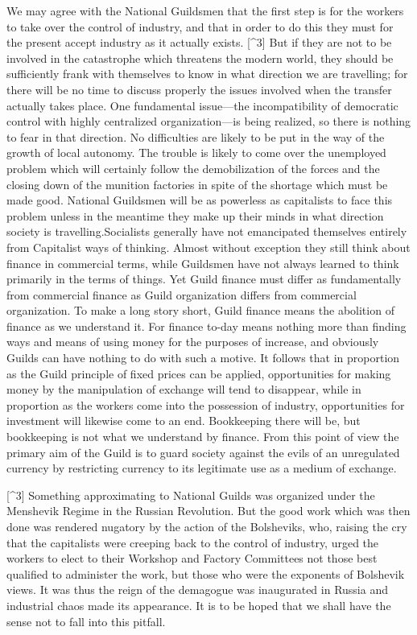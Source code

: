 \documentclass{book}
\begin{document}
We may agree with the National Guildsmen that the first step is for the workers to take over the control of industry, and that in order to do this they must for the present accept industry as it actually exists. {[}\textasciicircum{}3{]} But if they are not to be involved in the catastrophe which threatens the modern world, they should be sufficiently frank with themselves to know in what direction we are travelling; for there will be no time to discuss properly the issues involved when the transfer actually takes place. One fundamental issue—the incompatibility of democratic control with highly centralized organization—is being realized, so there is nothing to fear in that direction. No difficulties are likely to be put in the way of the growth of local autonomy. The trouble is likely to come over the unemployed problem which will certainly follow the demobilization of the forces and the closing down of the munition factories in spite of the shortage which must be made good. National Guildsmen will be as powerless as capitalists to face this problem unless in the meantime they make up their minds in what direction society is travelling.\footnotemark[3] Socialists generally have not emancipated themselves entirely from Capitalist ways of thinking. Almost without exception they still think about finance in commercial terms, while Guildsmen have not always learned to think primarily in the terms of things. Yet Guild finance must differ as fundamentally from commercial finance as Guild organization differs from commercial organization. To make a long story short, Guild finance means the abolition of finance as we understand it. For finance to-day means nothing more than finding ways and means of using money for the purposes of increase, and obviously Guilds can have nothing to do with such a motive. It follows that in proportion as the Guild principle of fixed prices can be applied, opportunities for making money by the manipulation of exchange will tend to disappear, while in proportion as the workers come into the possession of industry, opportunities for investment will likewise come to an end. Bookkeeping there will be, but bookkeeping is not what we understand by finance. From this point of view the primary aim of the Guild is to guard society against the evils of an unregulated currency by restricting currency to its legitimate use as a medium of exchange.

{[}\textasciicircum{}3{]} Something approximating to National Guilds was organized under the Menshevik Regime in the Russian Revolution. But the good work which was then done was rendered nugatory by the action of the Bolsheviks, who, raising the cry that the capitalists were creeping back to the control of industry, urged the workers to elect to their Workshop and Factory Committees not those best qualified to administer the work, but those who were the exponents of Bolshevik views. It was thus the reign of the demagogue was inaugurated in Russia and industrial chaos made its appearance. It is to be hoped that we shall have the sense not to fall into this pitfall.
\end{document}
